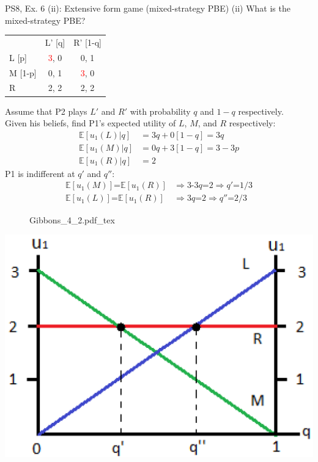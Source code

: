 \begin{frame}{PS8, Ex. 6 (ii): Extensive form game (mixed-strategy PBE)}
    (ii) What is the mixed-strategy PBE? \vspace{-8pt}
    \begin{multicols}{2}
      \begin{table}
        \begin{tabular}{l|c|c|}
          \multicolumn{1}{c}{} & \multicolumn{1}{c}{L' [q]} & \multicolumn{1}{c}{R' [1-q]} \\\cline{2-3}
          L [p]   & \textcolor{red}{3}, 0 & 0, \color{blue}1 \\\cline{2-3}
          M [1-p] & 0, \color{blue}1 & \textcolor{red}{3}, 0 \\\cline{2-3}
          R       & 2, \color{blue}2 & 2, \color{blue}2 \\\cline{2-3}
        \end{tabular}
      \end{table} \vspace{-4pt}
      Assume that P2 plays $L'$ and $R'$ with probability $q$ and $1-q$ respectively.\\\smallskip
      Given his beliefs, find P1's expected utility of $L$, $M$, and $R$ respectively: \vspace{-4pt}
      \begin{align*}
        \mathbb{E}[u_1(L)|q]&=3q+0[1-q]=3q\\
        \mathbb{E}[u_1(M)|q]&=0q+3[1-q]=3-3p\\
        \mathbb{E}[u_1(R)|q]&=2
      \end{align*}
      P1 is indifferent at $q'$ and $q''$: \vspace{-6pt}
      \begin{align*}
        \mathbb{E}[u_1(M)]\text{=}\mathbb{E}[u_1(R)]&\Rightarrow \text{3-3}q\text{=}2\Rightarrow q'\text{=}1/3\\
        \mathbb{E}[u_1(L)]\text{=}\mathbb{E}[u_1(R)]&\Rightarrow 3q\text{=}2\Rightarrow q''\text{=}2/3
      \end{align*}
      \vfill\null\columnbreak
      \begin{figure}[!h]
        \center {}
        {Gibbons_4_2.pdf_tex}
      \end{figure}
      \includegraphics[width=1.1\columnwidth]{figures/Gibbons_4_2_E[u]}

\end{multicols}
\end{frame}
